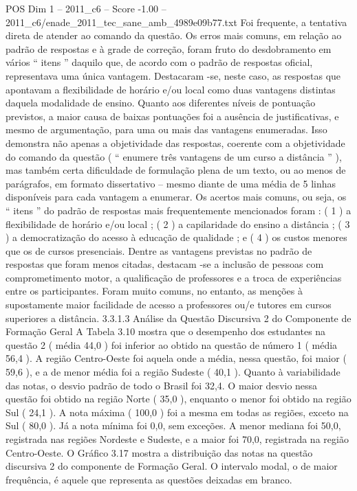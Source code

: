 \begin{textsample}{POS Dim 1 – 2011\_c6 – Score -1.00 – 2011\_c6/enade\_2011\_tec\_sane\_amb\_4989e09b77.txt}
Foi frequente, a tentativa direta de atender ao comando da questão.
Os erros mais comuns, em relação ao padrão de respostas e à grade de correção, foram fruto do desdobramento em vários “ itens ” daquilo que, de acordo com o padrão de respostas oficial, representava uma única vantagem.
Destacaram -se, neste caso, as respostas que apontavam a flexibilidade de horário e/ou local como duas vantagens distintas daquela modalidade de ensino.
Quanto aos diferentes níveis de pontuação previstos, a maior causa de baixas pontuações foi a ausência de justificativas, e mesmo de argumentação, para uma ou mais das vantagens enumeradas.
Isso demonstra não apenas a objetividade das respostas, coerente com a objetividade do comando da questão ( “ enumere três vantagens de um curso a distância ” ), mas também certa dificuldade de formulação plena de um texto, ou ao menos de parágrafos, em formato dissertativo – mesmo diante de uma média de 5 linhas disponíveis para cada vantagem a enumerar.
Os acertos mais comuns, ou seja, os “ itens ” do padrão de respostas mais frequentemente mencionados foram : ( 1 ) a flexibilidade de horário e/ou local ; ( 2 ) a capilaridade do ensino a distância ; ( 3 ) a democratização do acesso à educação de qualidade ; e ( 4 ) os custos menores que os de cursos presenciais.
Dentre as vantagens previstas no padrão de respostas que foram menos citadas, destacam -se a inclusão de pessoas com comprometimento motor, a qualificação de professores e a troca de experiências entre os participantes.
Foram muito comuns, no entanto, as menções à supostamente maior facilidade de acesso a professores ou/e tutores em cursos superiores a distância. 3.3.1.3 Análise da Questão Discursiva 2 do Componente de Formação Geral A Tabela 3.10 mostra que o desempenho dos estudantes na questão 2 ( média 44,0 ) foi inferior ao obtido na questão de número 1 ( média 56,4 ).
A região Centro-Oeste foi aquela onde a média, nessa questão, foi maior ( 59,6 ), e a de menor média foi a região Sudeste ( 40,1 ).
Quanto à variabilidade das notas, o desvio padrão de todo o Brasil foi 32,4.
O maior desvio nessa questão foi obtido na região Norte ( 35,0 ), enquanto o menor foi obtido na região Sul ( 24,1 ).
A nota máxima ( 100,0 ) foi a mesma em todas as regiões, exceto na Sul ( 80,0 ).
Já a nota mínima foi 0,0, sem exceções.
A menor mediana foi 50,0, registrada nas regiões Nordeste e Sudeste, e a maior foi 70,0, registrada na região Centro-Oeste.
O Gráfico 3.17 mostra a distribuição das notas na questão discursiva 2 do componente de Formação Geral.
O intervalo modal, o de maior frequência, é aquele que representa as questões deixadas em branco.

\end{textsample}
